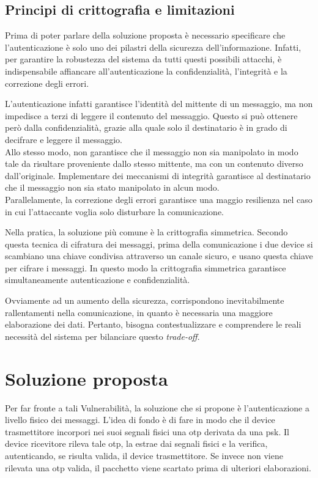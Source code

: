 \subsection{Principi di crittografia e limitazioni}
Prima di poter parlare della soluzione proposta è necessario specificare che l'autenticazione è solo uno dei pilastri della sicurezza dell'informazione. Infatti, per garantire la robustezza del sistema da tutti questi possibili attacchi, è indispensabile affiancare all'autenticazione la confidenzialità, l'integrità e la correzione degli errori.

L'autenticazione infatti garantisce l'identità del mittente di un messaggio, ma non impedisce a terzi di leggere il contenuto del messaggio. Questo si può ottenere però dalla confidenzialità, grazie alla quale solo il destinatario è in grado di decifrare e leggere il messaggio.\\
Allo stesso modo, non garantisce che il messaggio non sia manipolato in modo tale da risultare proveniente dallo stesso mittente, ma con un contenuto diverso dall'originale. Implementare dei meccanismi di integrità garantisce al destinatario che il messaggio non sia stato manipolato in alcun modo.\\
Parallelamente, la correzione degli errori garantisce una maggio resilienza nel caso in cui l'attaccante voglia solo disturbare la comunicazione.

Nella pratica, la soluzione più comune è la crittografia simmetrica. Secondo questa tecnica di cifratura dei messaggi, prima della comunicazione i due device si scambiano una chiave condivisa attraverso un canale sicuro, e usano questa chiave per cifrare i messaggi. In questo modo la crittografia simmetrica garantisce simultaneamente autenticazione e confidenzialità.

Ovviamente ad un aumento della sicurezza, corrispondono inevitabilmente rallentamenti nella comunicazione, in quanto è necessaria una maggiore elaborazione dei dati. Pertanto, bisogna contestualizzare e comprendere le reali necessità del sistema per bilanciare questo \textit{trade-off}.

\section{Soluzione proposta}

Per far fronte a tali Vulnerabilità, la soluzione che si propone è l'autenticazione a livello fisico dei messaggi. L'idea di fondo è di fare in modo che il device trasmettitore incorpori nei suoi segnali fisici una \gls{otp} derivata da una \gls{psk}. Il device ricevitore rileva tale \gls{otp}, la estrae dai segnali fisici e la verifica, autenticando, se risulta valida, il device trasmettitore. Se invece non viene rilevata una \gls{otp} valida, il pacchetto viene scartato prima di ulteriori elaborazioni.

